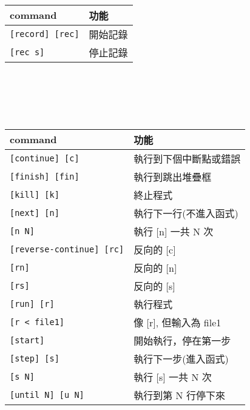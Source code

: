 \begin{center}
     \\
    \begin{tabular}{|p{2.7cm}|p{2.7cm}|}
        \hline
        command                         & 功能 \\
        \hline
        \verb|[record] [rec]|           & 開始記錄 \\
        \verb|[rec s]|                  & 停止記錄 \\
        \hline
    \end{tabular} \\
    \hspace{\fill} \\
    \hspace{\fill} \\

     \\
    \begin{tabular}{|p{2.7cm}|p{2.7cm}|}
        \hline
        command                         & 功能 \\
        \hline
        \verb|[continue] [c]|           & 執行到下個中斷點或錯誤 \\
        \verb|[finish] [fin]|           & 執行到跳出堆疊框 \\
        \verb|[kill] [k]|               & 終止程式 \\
        \verb|[next] [n]|               & 執行下一行(不進入函式) \\
        \verb|[n N]|                    & 執行 [n] 一共 N 次 \\
        \verb|[reverse-continue] [rc]|  & 反向的 [c] \\
        \verb|[rn]|                     & 反向的 [n] \\
        \verb|[rs]|                     & 反向的 [s] \\
        \verb|[run] [r]|                & 執行程式 \\
        \verb|[r < file1]|              & 像 [r], 但輸入為 file1 \\
        \verb|[start]|                  & 開始執行，停在第一步 \\
        \verb|[step] [s]|               & 執行下一步(進入函式) \\
        \verb|[s N]|                    & 執行 [s] 一共 N 次 \\
        \verb|[until N] [u N]|          & 執行到第 N 行停下來 \\
        \hline
    \end{tabular}
    \columnbreak


\end{center}
